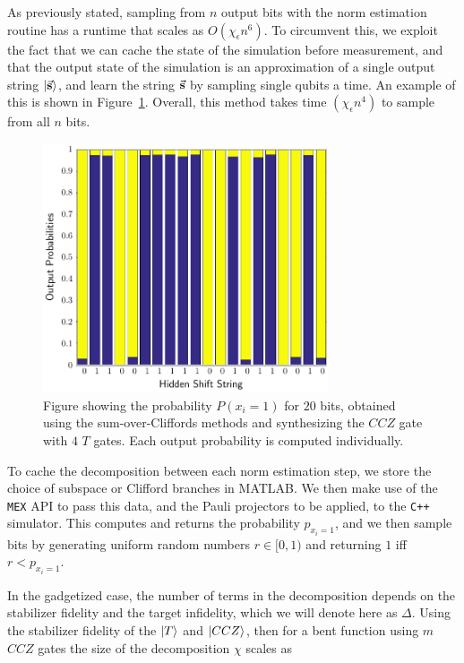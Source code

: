 As previously stated, sampling from $n$ output bits with the norm estimation routine has a runtime that scales as $O\left(\chi_{\epsilon}n^{6}\right)$. To circumvent this, we exploit the fact that we can cache the state of the simulation before measurement, and that the output state of the simulation is an approximation of a single output string $\ket{\va{s}}$, and learn the string $\va{s}$ by sampling single qubits a time. An example of this is shown in Figure~\ref{fig:hs_readout}. Overall, this method takes time $\left(\chi_{\epsilon}n^{4}\right)$ to sample from all $n$ bits.\par
\begin{figure}[t]
\centering
\includegraphics[width=0.75\textwidth]{Figures/HiddenShiftHistogram.pdf}
\caption{Figure showing the probability $P\left(x_{i}=1\right)$ for $20$ bits, obtained using the sum-over-Cliffords methods and synthesizing the $CCZ$ gate with $4$ $T$ gates. Each output probability is computed individually.}
\label{fig:hs_readout}
\end{figure}
To cache the decomposition between each norm estimation step, we store the choice of subspace or Clifford branches in MATLAB. We then make use of the \texttt{MEX} API to pass this data, and the Pauli projectors to be applied, to the \texttt{C++} simulator. This computes and returns the probability $p_{x_{i}=1}$, and we then sample bits by generating uniform random numbers $r\in [0,1)$ and returning $1$ iff $r<p_{x_{i}=1}$.\par
In the gadgetized case, the number of terms in the decomposition depends on the stabilizer fidelity and the target infidelity, which we will denote here as $\Delta$. Using the stabilizer fidelity of the $\ket{T}$ and $\ket{CCZ}$, then for a bent function using $m$ $CCZ$ gates the size of the decomposition $\chi$ scales as
